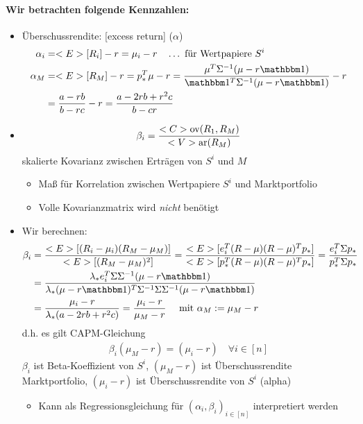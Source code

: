 \paragraph*{Wir betrachten folgende Kennzahlen:}
\begin{itemize}
	\item Überschussrendite: [excess return] ($\alpha$)
	\begin{align*}
		\alpha_i &= \E[R_i] - r = \mu_i - r \quad \dots \text{ für Wertpapiere }S^i\\
		\alpha_M &= \E[R_M] - r = p_{\ast}^T\mu -r = \frac{\mu^T \Sigma^{-1}(\mu - r\indi)}{\indi^T\Sigma^{-1}(\mu - r \indi)} - r \\
		&= \frac{a - rb}{b-rc} - r = \frac{a - 2rb +r^2c}{b-cr}
	\end{align*}
	\item {}
	\begin{align*}
		\beta_i = \frac{<C>\text{ov}(R_1,R_M)}{<V>\text{ar}(R_M)}
	\end{align*}
	skalierte Kovarianz zwischen Erträgen von $S^i$ und $M$
	\begin{itemize}
		\item Maß für Korrelation zwischen Wertpapiere $S^i$ und Marktportfolio
		\item Volle Kovarianzmatrix wird \emph{nicht} benötigt
	\end{itemize}
	\item Wir berechnen:
	\begin{align*}
		\beta_i &= \frac{\E[(R_i - \mu_i)(R_M-\mu_M)]}{\E[(R_M - \mu_M)^2]} = \frac{\E[e_i^T(R-\mu)(R-\mu)^Tp_{\ast}]}{\E[p_{\ast}^T(R-\mu)(R-\mu)^Tp_{\ast}]} = \frac{e_i^T \Sigma p_{\ast}}{p_{\ast}^T \Sigma p_{\ast}}\\
		&= \frac{\lambda_{\ast} e_i^T \Sigma \Sigma^{-1}(\mu - r \indi)}{\lambda_{\ast} (\mu - r \indi)^T \Sigma^{-1}\Sigma \Sigma^{-1}(\mu - r \indi)}\\
		&= \frac{\mu_i - r}{\lambda_{\ast}(a-2rb+r^2c)} = \frac{\mu_i -r}{\mu_M - r} \quad \mit \alpha_M := \mu_M - r
	\end{align*}
	d.h. es gilt CAPM-Gleichung
	\begin{align*}
		\beta_i(\mu_M -r) = (\mu_i-r) \quad \forall i \in [n]
	\end{align*}
	$\beta_i$ ist Beta-Koeffizient von $S^i$, $(\mu_M -r)$ ist Überschussrendite Marktportfolio, $(\mu_i - r)$ ist Überschussrendite von $S^i$ (alpha)
	\begin{itemize}
		\item Kann als Regressionsgleichung für $(\alpha_i, \beta_i)_{i \in [n]}$ interpretiert werden

\end{itemize}
\end{itemize}
